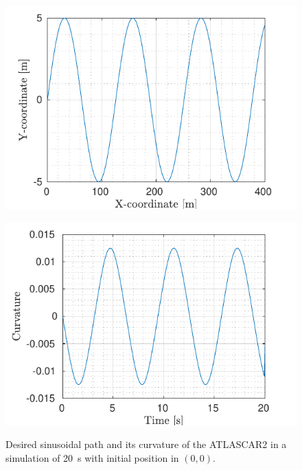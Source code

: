 \begin{figure}[!h]
	\begin{minipage}[t]{0.5\textwidth}
		\includegraphics[width=\textwidth]{../../MATLAB/lane_following/figure/Reference.pdf}
		\subcaption{}
		\label{fig:reference_laneFollowing}
	\end{minipage}
	\begin{minipage}[t]{0.5\textwidth}
		\includegraphics[width=\textwidth]{../../MATLAB/lane_following/figure/Curvature.pdf}
		\subcaption{}
		\label{fig:curvature_laneFollowing}
	\end{minipage}
	\caption{Desired sinusoidal path and its curvature of the ATLASCAR2 in a simulation of \SI{20}{s} with initial position in $(0,0)$.}
	\label{fig:laneFollowing_desired}
\end{figure}

